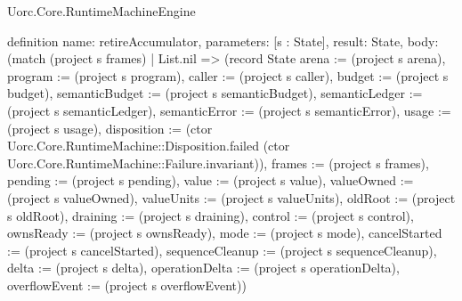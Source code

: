 \begin{lexlean}{Uorc.Core.RuntimeMachineEngine}
\begin{semanticmodule}
definition{
  name: retireAccumulator,
  parameters: [s : State],
  result: State,
  body: (match (project s frames)
    | List.nil => (record State {arena := (project s arena), program := (project s program), caller := (project s caller), budget := (project s budget), semanticBudget := (project s semanticBudget), semanticLedger := (project s semanticLedger), semanticError := (project s semanticError), usage := (project s usage), disposition := (ctor Uorc.Core.RuntimeMachine::Disposition.failed (ctor Uorc.Core.RuntimeMachine::Failure.invariant)), frames := (project s frames), pending := (project s pending), value := (project s value), valueOwned := (project s valueOwned), valueUnits := (project s valueUnits), oldRoot := (project s oldRoot), draining := (project s draining), control := (project s control), ownsReady := (project s ownsReady), mode := (project s mode), cancelStarted := (project s cancelStarted), sequenceCleanup := (project s sequenceCleanup), delta := (project s delta), operationDelta := (project s operationDelta), overflowEvent := (project s overflowEvent)})
}
\end{semanticmodule}
\end{lexlean}
